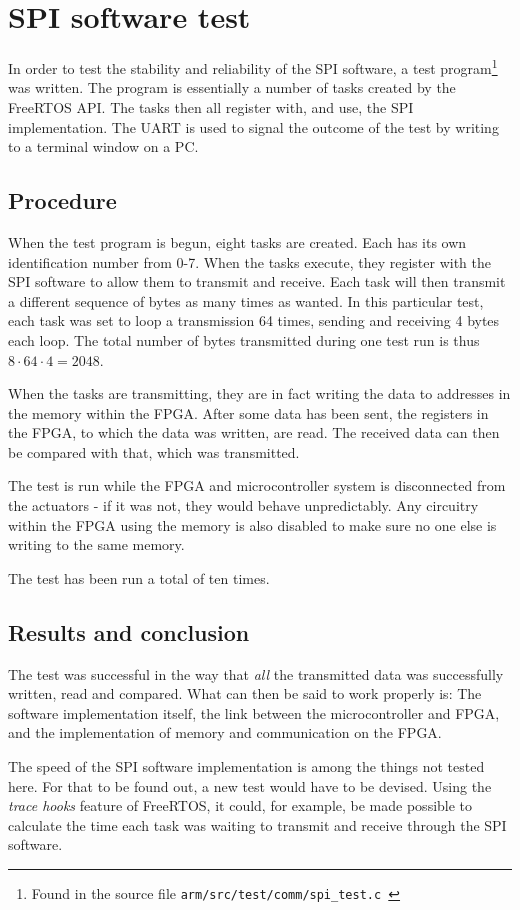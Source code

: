 \chapter{SPI software test}\label{sec:armspitest}
In order to test the stability and reliability of the SPI software, a test program\footnote{Found in the source file \texttt{arm/src/test/comm/spi\_test.c
}} was written. The program is essentially a number of tasks created by the FreeRTOS API. The tasks then all register with, and use, the SPI implementation. The UART is used to signal the outcome of the test by writing to a terminal window on a PC.


\section{Procedure}
When the test program is begun, eight tasks are created. Each has its own identification number from 0-7. When the tasks execute, they register with the SPI software to allow them to transmit and receive. Each task will then transmit a different sequence of bytes as many times as wanted. In this particular test, each task was set to loop a transmission 64 times, sending and receiving 4 bytes each loop. The total number of bytes transmitted during one test run is thus $8 \cdot 64 \cdot 4 = 2048$.

When the tasks are transmitting, they are in fact writing the data to addresses in the memory within the FPGA. After some data has been sent, the registers in the FPGA, to which the data was written, are read. The received data can then be compared with that, which was transmitted.

The test is run while the FPGA and microcontroller system is disconnected from the actuators - if it was not, they would behave unpredictably. Any circuitry within the FPGA using the memory is also disabled to make sure no one else is writing to the same memory.

The test has been run a total of ten times.

\section{Results and conclusion}
The test was successful in the way that \textit{all} the transmitted data was successfully written, read and compared. What can then be said to work properly is: The software implementation itself, the link between the microcontroller and FPGA, and the implementation of memory and communication on the FPGA. 

The speed of the SPI software implementation is among the things not tested here. For that to be found out, a new test would have to be devised. Using the \textit{trace hooks} feature of FreeRTOS, it could, for example, be made possible to calculate the time each task was waiting to transmit and receive through the SPI software.


